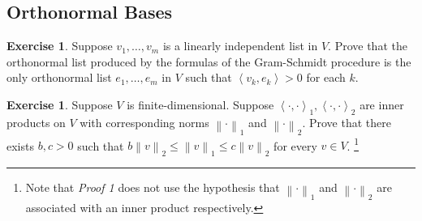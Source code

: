 \documentclass[nofonts,colorlinks]{tufte-handout}
\theoremstyle{plain} %
\theoremstyle{definition}
\newtheorem{exer}[thm]{Exercise}
\theoremstyle{remark}
\def\idea{\textit{\color[rgb]{0,0,.55}Proof Idea. }}
\newcommand{\cbra}[1]{\mathopen{}\left\{#1\right\}}
\newcommand{\norm}[1]{\mathopen{}\left\lVert#1\right\rVert}
\newcommand{\inp}[2]{\mathopen{}\left\langle#1,#2\right\rangle}
\newcommand{\abs}[1]{\mathopen{}\left|#1\right|}
\newcommand{\R}{\mathbb{R}}
\newcommand{\F}{\mathbb{F}}
\begin{document}
\subsection{Orthonormal Bases}
\begin{exer}
	Suppose $v_1,\dots,v_m$ is a linearly independent list in $V$. Prove that the orthonormal list produced by the formulas of the Gram-Schmidt procedure is the only orthonormal list $e_1,\dots,e_m$ in $V$ such that $\inp{v_k}{e_k}>0$ for each $k$.
\end{exer}

\begin{exer}
	Suppose $V$ is finite-dimensional. Suppose $\inp{\cdot}{\cdot}_1,\inp{\cdot}{\cdot}_2$ are inner products on $V$ with corresponding norms $\norm{\cdot}_1$ and $\norm{\cdot}_2$. Prove that there exists $b,c>0$ such that $b\norm{v}_2\leq\norm{v}_1\leq c\norm{v}_2$ for every $v\in V$.%
	\footnote{Note that \textit{Proof 1} does not use the hypothesis that $\norm{\cdot}_1$ and $\norm{\cdot}_2$ are associated with an inner product respectively.}
\end{exer}
	
\end{document}
